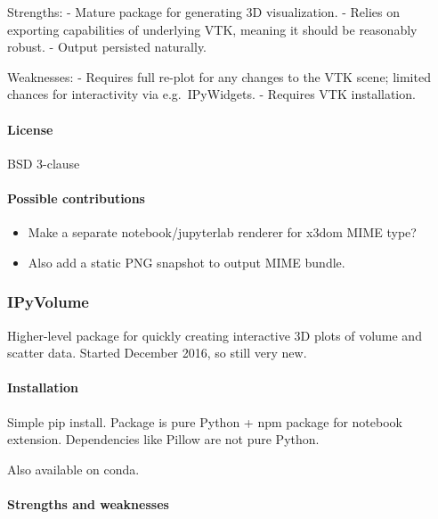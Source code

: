 Strengths: - Mature package for generating 3D visualization. - Relies on
exporting capabilities of underlying VTK, meaning it should be
reasonably robust. - Output persisted naturally.

Weaknesses: - Requires full re-plot for any changes to the VTK scene;
limited chances for interactivity via e.g.~IPyWidgets. - Requires VTK
installation.

\hypertarget{license}{%
\paragraph{License}\label{license}}

BSD 3-clause

\hypertarget{possible-contributions}{%
\paragraph{Possible contributions}\label{possible-contributions}}

\begin{itemize}
\tightlist
\item
  Make a separate notebook/jupyterlab renderer for x3dom MIME type?
\item
  Also add a static PNG snapshot to output MIME bundle.
\end{itemize}

    \hypertarget{ipyvolume}{%
\subsubsection{IPyVolume}\label{ipyvolume}}

Higher-level package for quickly creating interactive 3D plots of volume
and scatter data. Started December 2016, so still very new.

\hypertarget{installation}{%
\paragraph{Installation}\label{installation}}

Simple pip install. Package is pure Python + npm package for notebook
extension. Dependencies like Pillow are not pure Python.

Also available on conda.

\hypertarget{strengths-and-weaknesses}{%
\paragraph{Strengths and
weaknesses}\label{strengths-and-weaknesses}}

